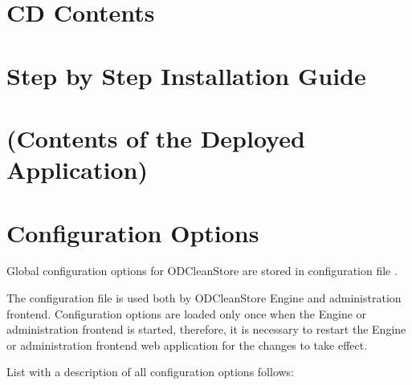 \chapter{CD Contents}

\chapter{Step by Step Installation Guide}



\chapter{(Contents of the Deployed Application)}


\chapter{Configuration Options}
 \label{chap:configOptions}
Global configuration options for ODCleanStore are stored in configuration file . 

The configuration file is used both by ODCleanStore Engine and administration frontend. Configuration options are loaded only once when the Engine or administration frontend is started, therefore, it is necessary to restart the Engine or administration frontend web application for the changes to take effect.

List with a description of all configuration options follows:

